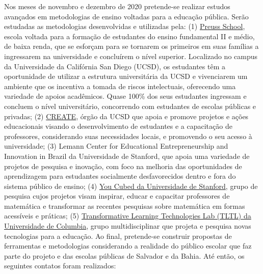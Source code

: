 \documentclass[
]{book}
\begin{document}
Nos meses de novembro e dezembro de 2020 pretende-se realizar estudos avançados em metodologias de ensino voltadas para a educação pública. Serão estudadas as metodologias desenvolvidas e utilizadas pela: (1) \href{https://preuss.ucsd.edu/}{Preuss School}, escola voltada para a formação de estudantes do ensino fundamental II e médio, de baixa renda, que se esforçam para se tornarem os primeiros em suas famílias a ingressarem na universidade e concluírem o nível superior. Localizado no campus da Universidade da Califórnia San Diego (UCSD), os estudantes têm a oportunidade de utilizar a estrutura universitária da UCSD e vivenciarem um ambiente que os incentiva a tomada de riscos intelectuais, oferecendo uma variedade de apoios acadêmicos. Quase 100\% dos seus estudantes ingressam e concluem o nível universitário, concorrendo com estudantes de escolas públicas e privadas; (2) \href{https://create.ucsd.edu/}{CREATE}, órgão da UCSD que apoia e promove projetos e ações educacionais visando o desenvolvimento de estudantes e a capacitação de professores, considerando suas necessidades locais, e promovendo o seu acesso à universidade; (3) Lemann Center for Educational Entrepreneurship and Innovation in Brazil da Universidade de Stanford, que apoia uma variedade de projetos de pesquisa e inovação, com foco na melhoria das oportunidades de aprendizagem para estudantes socialmente desfavorecidos dentro e fora do sistema público de ensino; (4) \href{https://www.youcubed.org/}{You Cubed da Universidade de Stanford}, grupo de pesquisa cujos projetos visam inspirar, educar e capacitar professores de matemática e transformar as recentes pesquisas sobre matemática em formas acessíveis e práticas; (5) \href{https://tltlab.org/}{Transformative Learning Technologies Lab (TLTL) da Universidade de Columbia}, grupo multidisciplinar que projeta e pesquisa novas tecnologias para a educação. Ao final, pretende-se construir propostas de ferramentas e metodologias considerando a realidade do público escolar que faz parte do projeto e das escolas públicas de Salvador e da Bahia. Até então, os seguintes contatos foram realizados:
\end{document}
